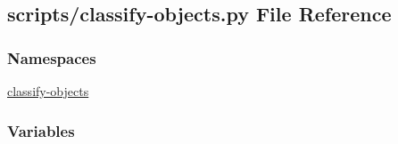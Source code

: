\hypertarget{classify-objects_8py}{\subsection{scripts/classify-\/objects.py File Reference}
\label{classify-objects_8py}
}
\subsubsection*{Namespaces}
\begin{DoxyCompactItemize}
\item 
\hyperlink{namespaceclassify-objects}{classify-\/objects}
\end{DoxyCompactItemize}
\subsubsection*{Variables}
